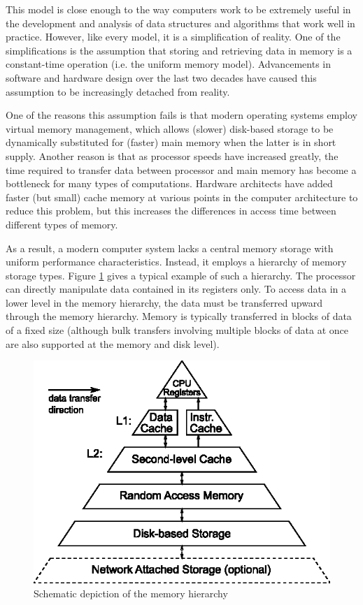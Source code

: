 \documentclass{acm_proc_article-sp}
\begin{document}
This model is close enough to the way computers work to be extremely useful in the development and analysis of data structures and algorithms that work well in practice. However, like every model, it is a simplification of reality. One of the simplifications is the assumption that storing and retrieving data in memory is a constant-time operation (i.e. the uniform memory model). Advancements in software and hardware design over the last two de\-cades have caused this assumption to be increasingly detached from reality.

One of the reasons this assumption fails is that modern operating systems employ virtual memory management, which allows (slower) disk-based storage to be dynamically substituted for (fast\-er) main memory when the latter is in short supply. Another reason is that as processor speeds have increased greatly, the time required to transfer data between processor and main memory has become a bottleneck for many types of computations. Hardware architects have added faster (but small) cache memory at various points in the computer architecture to reduce this problem, but this increases the differences in access time between different types of memory.

As a result, a modern computer system lacks a central memory storage with uniform performance characteristics. Instead, it employs a hierarchy of memory storage types. Figure \ref{fig-memhier} gives a typical example of such a hierarchy. The processor can directly manipulate data contained in its registers only. To access data in a lower level in the memory hierarchy, the data must be transferred upward through the memory hierarchy. Memory is typically transferred in blocks of data of a fixed size (although bulk transfers involving multiple blocks of data at once are also supported at the memory and disk level).

\begin{figure}
\centering
\includegraphics{memhier}
\caption{Schematic depiction of the memory hierarchy}\label{fig-memhier}
\end{figure}
\end{document}
